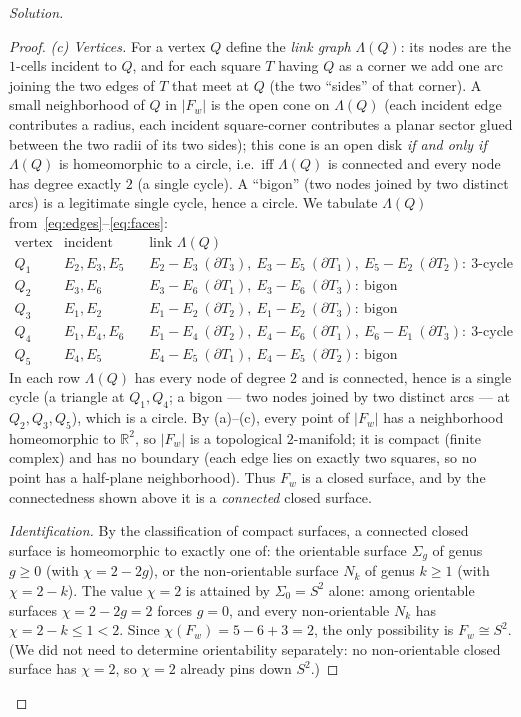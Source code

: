\documentclass{amsart}
\theoremstyle{definition}
\newcommand{\RR}{\mathbb{R}}
\newcommand{\bdy}{\partial}
\begin{document}
\begin{proof}[Solution]
\begin{proof}
\emph{(c) Vertices.} For a vertex $Q$ define the \emph{link graph} $\Lambda(Q)$: its nodes are
the $1$-cells incident to $Q$, and for each square $T$ having $Q$ as a corner we add one arc
joining the two edges of $T$ that meet at $Q$ (the two ``sides'' of that corner). A small
neighborhood of $Q$ in $|F_w|$ is the open cone on $\Lambda(Q)$ (each incident edge contributes
a radius, each incident square-corner contributes a planar sector glued between the two radii of
its two sides); this cone is an open disk \emph{if and only if} $\Lambda(Q)$ is homeomorphic to
a circle, i.e.\ iff $\Lambda(Q)$ is connected and every node has degree exactly $2$ (a single
cycle). A ``bigon'' (two nodes joined by two distinct arcs) is a legitimate single cycle, hence
a circle. We tabulate $\Lambda(Q)$ from~\eqref{eq:edges}--\eqref{eq:faces}:
\[
\begin{array}{l|l|l}
\text{vertex} & \text{incident edges} & \text{link } \Lambda(Q)\\\hline
Q_1 & E_2,E_3,E_5 & E_2\!-\!E_3\ (\bdy T_3),\ E_3\!-\!E_5\ (\bdy T_1),\ E_5\!-\!E_2\ (\bdy T_2):\ \text{3-cycle}\\
Q_2 & E_3,E_6 & E_3\!-\!E_6\ (\bdy T_1),\ E_3\!-\!E_6\ (\bdy T_3):\ \text{bigon}\\
Q_3 & E_1,E_2 & E_1\!-\!E_2\ (\bdy T_2),\ E_1\!-\!E_2\ (\bdy T_3):\ \text{bigon}\\
Q_4 & E_1,E_4,E_6 & E_1\!-\!E_4\ (\bdy T_2),\ E_4\!-\!E_6\ (\bdy T_1),\ E_6\!-\!E_1\ (\bdy T_3):\ \text{3-cycle}\\
Q_5 & E_4,E_5 & E_4\!-\!E_5\ (\bdy T_1),\ E_4\!-\!E_5\ (\bdy T_2):\ \text{bigon}
\end{array}
\]
In each row $\Lambda(Q)$ has every node of degree $2$ and is connected, hence is a single cycle
(a triangle at $Q_1,Q_4$; a bigon --- two nodes joined by two distinct arcs --- at
$Q_2,Q_3,Q_5$), which is a circle. By (a)--(c), every point of $|F_w|$ has a neighborhood
homeomorphic to $\RR^2$, so $|F_w|$ is a topological $2$-manifold; it is compact (finite
complex) and has no boundary (each edge lies on exactly two squares, so no point has a
half-plane neighborhood). Thus $F_w$ is a closed surface, and by the connectedness shown above
it is a \emph{connected} closed surface.

\emph{Identification.} By the classification of compact surfaces, a connected closed surface is
homeomorphic to exactly one of: the orientable surface $\Sigma_g$ of genus $g\ge0$ (with
$\chi=2-2g$), or the non-orientable surface $N_k$ of genus $k\ge1$ (with $\chi=2-k$). The value
$\chi=2$ is attained by $\Sigma_0=S^2$ alone: among orientable surfaces $\chi=2-2g=2$ forces
$g=0$, and every non-orientable $N_k$ has $\chi=2-k\le1<2$. Since $\chi(F_w)=5-6+3=2$, the only
possibility is $F_w\cong S^2$. (We did not need to determine orientability separately: no
non-orientable closed surface has $\chi=2$, so $\chi=2$ already pins down $S^2$.)


\end{proof}
\end{proof}
\end{document}
